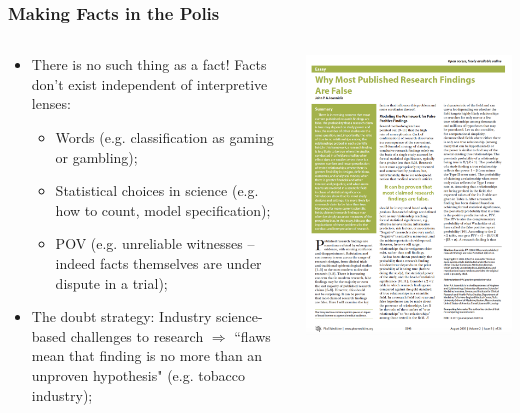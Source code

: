 \documentclass[aspectratio=169]{beamer}
\theoremstyle{principle}
\begin{document}
\begin{frame}
\frametitle{Making Facts in the Polis}

\begin{columns}
\begin{column}{0.5\textwidth}
\begin{itemize}
\item There is no such thing as a fact!  Facts don't exist independent of interpretive lenses:
\begin{itemize}
\item Words (e.g. classification as gaming or gambling);
\item Statistical choices in science (e.g. how to count, model specification);
\item POV (e.g. unreliable witnesses -- indeed facts themselves are under dispute in a trial);
\end{itemize}
\bigskip
\item The doubt strategy: Industry science-based challenges to research $\Rightarrow$ ``flaws mean that finding is no more than an unproven hypothesis" (e.g. tobacco industry);
\end{itemize}
\end{column}
\begin{column}{0.5\textwidth}
\includegraphics[scale=0.3]{False_pubs.png}
\end{column}
\end{columns}

\end{frame}
\end{document}
